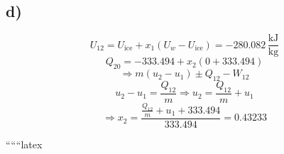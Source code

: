 

\subsection*{d)}
\[
U_{12} = U_{\text{ice}} + x_1 \left( U_{w} - U_{\text{ice}} \right) = -280.082 \, \frac{\text{kJ}}{\text{kg}}
\]
\[
Q_{20} = -333.494 + x_2 \left( 0 + 333.494 \right)
\]
\[
\Rightarrow m (u_2 - u_1) \pm Q_{12} - W_{12}
\]
\[
u_2 - u_1 = \frac{Q_{12}}{m} \Rightarrow u_2 = \frac{Q_{12}}{m} + u_1
\]
\[
\Rightarrow x_2 = \frac{\frac{Q_{12}}{m} + u_1 + 333.494}{333.494} = 0.43233
\]

``````latex